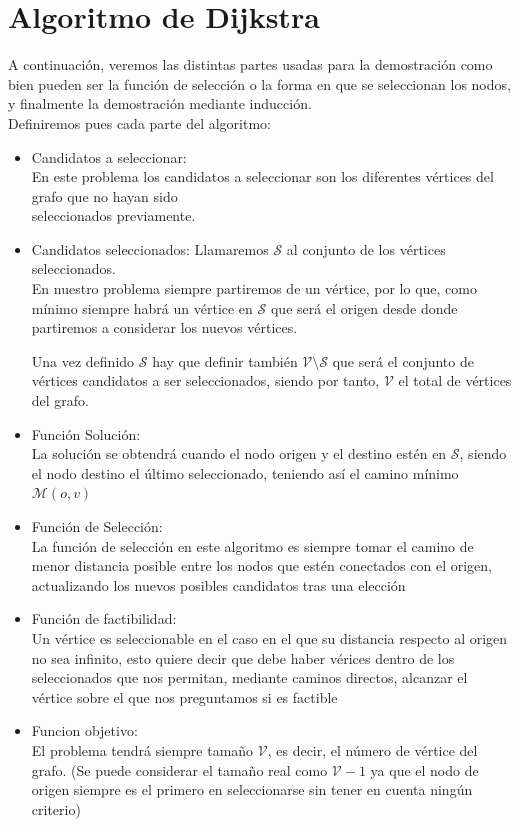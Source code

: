 \documentclass[11pt,openany]{book}
\begin{document}
\section{Algoritmo de Dijkstra}
A continuación, veremos las distintas partes usadas para la demostración como bien pueden ser la función de selección o
la forma en que se seleccionan los nodos, y finalmente la demostración mediante inducción. \\
Definiremos pues cada parte del algoritmo: \\
\begin{itemize}
      \item Candidatos a seleccionar:\\
            En este problema los candidatos a seleccionar son los diferentes vértices del grafo que no hayan sido \\
            seleccionados previamente.
      \item Candidatos seleccionados:
            Llamaremos $\mathscr{S}$ al conjunto de los vértices seleccionados. \\
            En nuestro problema siempre partiremos de un vértice, por lo que, como mínimo siempre habrá un vértice en $\mathscr{S}$ que será el origen 
            desde donde partiremos a considerar los nuevos vértices.

            Una vez definido $\mathscr{S}$ hay que definir también $\mathscr{V}\setminus\mathscr{S}$ que será el conjunto de vértices candidatos a ser seleccionados,
            siendo por tanto, $\mathscr{V}$ el total de vértices del grafo.

      \item Función Solución:\\
            La solución se obtendrá cuando el nodo origen y el destino estén en $\mathscr{S}$, siendo el nodo destino el último seleccionado, teniendo así el camino mínimo $\mathscr{M}(o,v)$

      \item Función de Selección:\\ 
            La función de selección en este algoritmo es siempre tomar el camino de menor distancia posible entre los nodos que estén conectados con el origen, actualizando los nuevos posibles candidatos 
            tras una elección

      \item Función de factibilidad:\\
            Un vértice es seleccionable en el caso en el que su distancia respecto al origen no sea infinito, esto quiere decir que debe haber vérices dentro de los seleccionados que nos permitan, mediante
            caminos directos, alcanzar el vértice sobre el que nos preguntamos si es factible

      \item Funcion objetivo: \\
            El problema tendrá siempre tamaño $\mathscr{V}$, es decir, el número de vértice del grafo. (Se puede considerar el tamaño real como $\mathscr{V}-1$ ya que el nodo de origen siempre es el primero en seleccionarse sin
            tener en cuenta ningún criterio)
\end{itemize}
\end{document}
